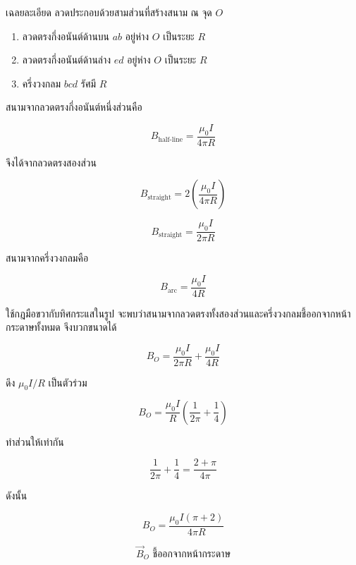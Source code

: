 \begin{examplebox}{เฉลยละเอียด}
ลวดประกอบด้วยสามส่วนที่สร้างสนาม ณ จุด $O$

\begin{enumerate}
    \item ลวดตรงกึ่งอนันต์ด้านบน $ab$ อยู่ห่าง $O$ เป็นระยะ $R$
    \item ลวดตรงกึ่งอนันต์ด้านล่าง $ed$ อยู่ห่าง $O$ เป็นระยะ $R$
    \item ครึ่งวงกลม $bcd$ รัศมี $R$
\end{enumerate}

สนามจากลวดตรงกึ่งอนันต์หนึ่งส่วนคือ

\[
B_{\text{half-line}}
=
\frac{\mu_0I}{4\pi R}
\]

จึงได้จากลวดตรงสองส่วน

\[
B_{\text{straight}}
=
2\left(
\frac{\mu_0I}{4\pi R}
\right)
\]

\[
B_{\text{straight}}
=
\frac{\mu_0I}{2\pi R}
\]

สนามจากครึ่งวงกลมคือ

\[
B_{\text{arc}}
=
\frac{\mu_0I}{4R}
\]

ใช้กฎมือขวากับทิศกระแสในรูป จะพบว่าสนามจากลวดตรงทั้งสองส่วนและครึ่งวงกลมชี้ออกจากหน้ากระดาษทั้งหมด จึงบวกขนาดได้

\[
B_O
=
\frac{\mu_0I}{2\pi R}
+
\frac{\mu_0I}{4R}
\]

ดึง $\mu_0I/R$ เป็นตัวร่วม

\[
B_O
=
\frac{\mu_0I}{R}
\left(
\frac{1}{2\pi}+\frac{1}{4}
\right)
\]

ทำส่วนให้เท่ากัน

\[
\frac{1}{2\pi}+\frac{1}{4}
=
\frac{2+\pi}{4\pi}
\]

ดังนั้น

\[
\boxed{
B_O
=
\frac{\mu_0I(\pi+2)}{4\pi R}}
\]

\[
\boxed{
\vec{B}_O\text{ ชี้ออกจากหน้ากระดาษ}}
\]
\end{examplebox}